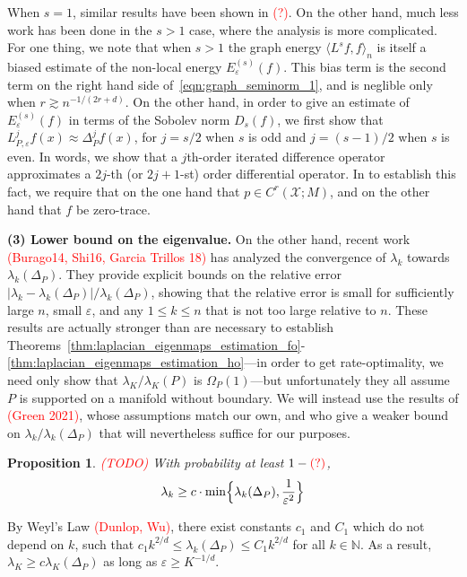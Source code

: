 \documentclass{article}
\newcommand{\1}{\mathbf{1}}
\newcommand{\mc}[1]{\mathcal{#1}}
\newcommand{\dotp}[2]{\langle #1, #2 \rangle}
\theoremstyle{alden}
\theoremstyle{aldenthm}
\newtheorem{proposition}{Proposition}
\theoremstyle{definition}
\theoremstyle{remark}
\begin{document}
When $s = 1$, similar results have been shown in \textcolor{red}{(?)}. On the other hand, much less work has been done in the $s > 1$ case, where the analysis is more complicated. For one thing, we note that when $s > 1$ the graph energy $\dotp{L^s f}{f}_n$ is itself a biased estimate of the non-local energy $E_{\varepsilon}^{(s)}(f)$. This bias term is the second term on the right hand side of~\eqref{eqn:graph_seminorm_1}, and is neglible only when $r \gtrsim n^{-1/(2r + d)}$. On the other hand, in order to give an estimate of $E_{\varepsilon}^{(s)}(f)$ in terms of the Sobolev norm $D_s(f)$, we first show that $L_{P,\varepsilon}^jf(x) \approx \Delta_P^jf(x)$, for $j = s/2$ when $s$ is odd and $j = (s - 1)/2$ when $s$ is even. In words, we show that a $j$th-order iterated difference operator approximates a $2j$-th (or $2j + 1$-st) order differential operator.  In to establish this fact, we require that on the one hand that $p \in C^{r}(\mc{X};M)$, and on the other hand that $f$ be zero-trace.

\textbf{(3) Lower bound on the eigenvalue.} On the other hand, recent work \textcolor{red}{(Burago14, Shi16, Garcia Trillos 18)} has analyzed the convergence of $\lambda_{k}$ towards $\lambda_{k}(\Delta_P)$. They provide explicit bounds on the relative error $|\lambda_{k} - \lambda_{k}(\Delta_P)|/\lambda_{k}(\Delta_P)$, showing that the relative error is small for sufficiently large $n$, small $\varepsilon$, and any $1 \leq k \leq n$ that is not too large relative to $n$. These results are actually stronger than are necessary to establish Theorems~\ref{thm:laplacian_eigenmaps_estimation_fo}-\ref{thm:laplacian_eigenmaps_estimation_ho}---in order to get rate-optimality, we need only show that $\lambda_{K}/\lambda_K(P)$ is $\Omega_P(1)$---but unfortunately they all assume $P$ is supported on a manifold without boundary. We will instead use the results of \textcolor{red}{(Green 2021)}, whose assumptions match our own, and who give a weaker bound on $\lambda_k/\lambda_k(\Delta_P)$ that will nevertheless suffice for our purposes. 

\begin{proposition}
	\label{prop:graph_eigenvalue}
	\textcolor{red}{(TODO)}
	With probability at least $1 - \textcolor{red}{(?)}$,
	\begin{equation*}
	\lambda_k \geq c \cdot \min\Bigl\{\lambda_k(\Delta_P), \frac{1}{\varepsilon^{2}} \Bigr\}
	\end{equation*}
\end{proposition}
By Weyl's Law \textcolor{red}{(Dunlop, Wu)}, there exist constants $c_1$ and $C_1$ which do not depend on $k$, such that $c_1 k^{2/d} \leq \lambda_{k}(\Delta_P) \leq C_1 k^{2/d}$ for all $k \in \mathbb{N}$. As a result, $\lambda_{K} \geq c \lambda_{K}(\Delta_P)$ as long as $\varepsilon \geq K^{-1/d}$. 
\end{document}
